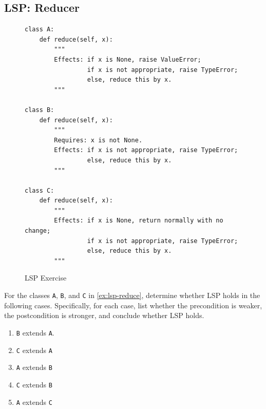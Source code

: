 \documentclass[oneside,11pt,dvipsnames]{book}
\newcommand{\sol}[1]{\iftoggle{usesol}{\textbf{Sol:} #1}{}}
\newcommand{\code}[1]{\texttt{#1}}
\begin{document}
\subsection{LSP: Reducer}
\begin{figure}
\begin{lstlisting}
class A:
    def reduce(self, x):
        """
        Effects: if x is None, raise ValueError;
                 if x is not appropriate, raise TypeError;
                 else, reduce this by x.
        """

class B:
    def reduce(self, x):
        """
        Requires: x is not None.
        Effects: if x is not appropriate, raise TypeError;
                 else, reduce this by x.
        """

class C:
    def reduce(self, x):
        """
        Effects: if x is None, return normally with no change;
                 if x is not appropriate, raise TypeError;
                 else, reduce this by x.
        """
\end{lstlisting}
\caption{LSP Exercise}\label{ex:lsp-reduce}
\end{figure}

For the classes \code{A}, \code{B}, and \code{C} in \autoref{ex:lsp-reduce}, determine whether LSP holds in the following cases. Specifically, for each case, list whether the precondition is weaker, the postcondition is stronger, and conclude whether LSP holds.
\begin{enumerate}
    \item \code{B} extends \code{A}.
    \sol{B's pre is stronger than A's because it requires that $x$ is not None while A's has no pre. \textbf{LSP does not hold}. The posts of \code{A} and \code{B} are the same}
    \item \code{C} extends \code{A}
    \sol{Pre's are the same (both are total methods). C's post is stronger than A's because it allows $x$ to be None while A's does not. \textbf{LSP holds}.}
    \item \code{A} extends \code{B}
    \sol{A's pre is weaker than B's because A has no pre. The posts for both are essentially the same because B's pre explicitly requires $x$ to be not None. \textbf{LSP holds}. Note that you might argue A's post is stronger, which is also fine and also means LSP holds.}
    \item \code{C} extends \code{B}
    \sol{C's pre is weaker than B's because C allows $x$ to be None while B does not. The posts are the same. \textbf{LSP does not hold}.}
    \item \code{A} extends \code{C}
\end{enumerate}
\end{document}
